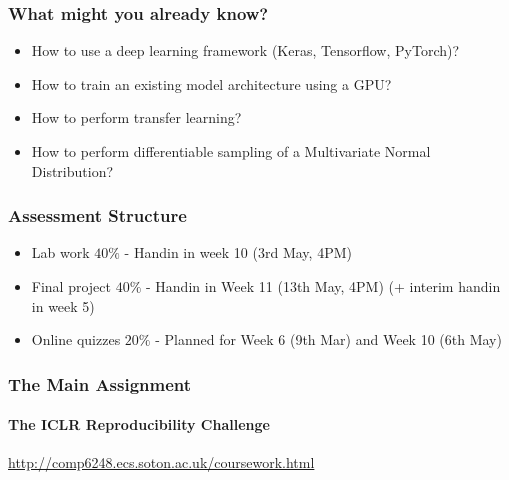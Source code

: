 \documentclass[\beamerclass]{beamer}
\begin{document}
\begin{frame}
	\frametitle{What might you already know?}	
	\begin{itemize}
	\item<+-> How to use a deep learning framework (Keras, Tensorflow, PyTorch)?
	\item<+-> How to train an existing model architecture using a GPU?
	\item<+-> How to perform transfer learning?
	\item<+-> How to perform differentiable sampling of a Multivariate Normal Distribution?
	\end{itemize}
\end{frame}

\begin{frame}
	\frametitle{Assessment Structure}
	\begin{itemize}
		\item Lab work $40\%$ - Handin in week 10 (3rd May, 4PM)
		\item Final project $40\%$  - Handin in Week 11 (13th May, 4PM) (+ interim handin in week 5)
		\item Online quizzes $20\%$ - Planned for Week 6 (9th Mar) and Week 10 (6th May) 
	\end{itemize}
\end{frame}

	
	

\begin{frame}
	\frametitle{The Main Assignment}
	\framesubtitle{The ICLR Reproducibility Challenge}
	\url{http://comp6248.ecs.soton.ac.uk/coursework.html}
\end{frame}
\end{document}
